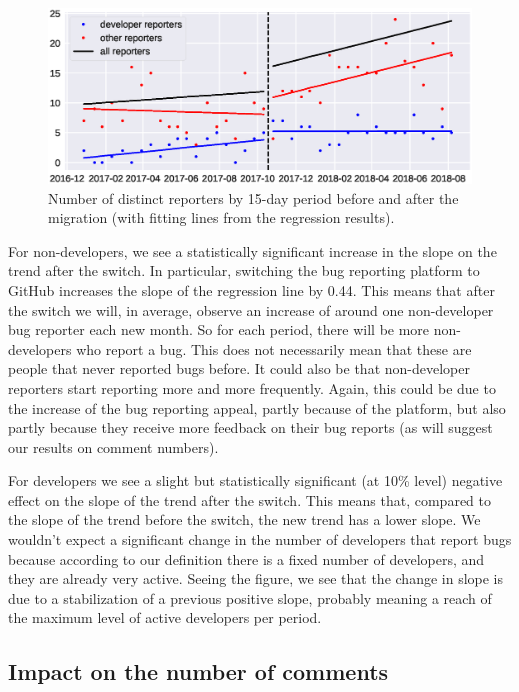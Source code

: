 \documentclass[runningheads]{llncs}
\begin{document}
\begin{figure}
\includegraphics[width=\textwidth]{reporter_nb_rd.eps}
\caption{Number of distinct reporters by 15-day period before and after the migration (with fitting lines from the regression results).} \label{reporter_nb_rd}
\end{figure}

For non-developers, we see a statistically significant increase in the slope on the trend after the switch.
In particular, switching the bug reporting platform to GitHub increases the slope of the regression line by 0.44. This means that after the switch we will, in average, observe an increase of around one non-developer bug reporter each new month.
So for each period, there will be more non-developers who report a bug. This does not necessarily mean that these are people that never reported bugs before. It could also be that non-developer reporters start reporting more and more frequently. Again, this could be due to the increase of the bug reporting appeal, partly because of the platform, but also partly because they receive more feedback on their bug reports (as will suggest our results on comment numbers). 

For developers we see a slight but statistically significant (at 10\% level) negative effect on the slope of the trend after the switch. This means that, compared to the slope of the trend before the switch, the new trend has a lower slope. We wouldn't expect a significant change in the number of developers that report bugs because according to our definition there is a fixed number of developers, and they are already very active. Seeing the figure, we see  that the change in slope is due to a stabilization of a previous positive slope, probably meaning a reach of the maximum level of active developers per period. 

\subsection{Impact on the number of comments}
\end{document}
